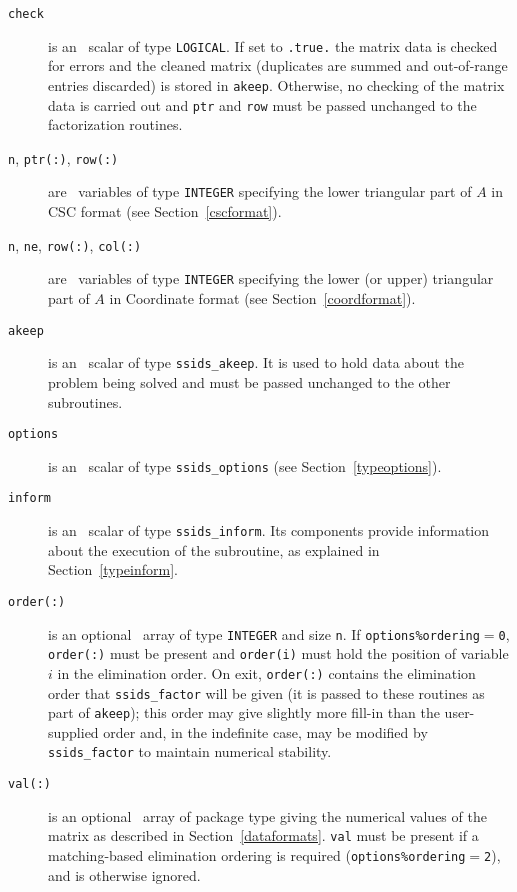 \documentclass{spral}
\begin{document}
\vspace*{-3mm}
\begin{description}

\item[\texttt{check}] is an \intentin\ scalar of
type  {\tt LOGICAL}. If set to {\tt .true.} the matrix
data is checked for errors and the cleaned matrix
(duplicates are summed and out-of-range entries
discarded) is stored in {\tt akeep}.
Otherwise, no checking of the matrix data is carried out
and {\tt ptr} and {\tt row} must be passed unchanged to the factorization routines.

\item[\texttt{n}{\rm ,} \texttt{ptr(:)}{\rm ,} \texttt{row(:)}] are \intentin\ 
   variables of type {\tt INTEGER} specifying the lower triangular part of $A$
   in CSC format (see Section~\ref{cscformat}).

\item[\texttt{n}{\rm ,} \texttt{ne}{\rm ,} \texttt{row(:)}{\rm ,} \texttt{col(:)}]
   are \intentin\ variables of type {\tt INTEGER} specifying the lower
   (or upper) triangular part of $A$ in Coordinate format (see Section~\ref{coordformat}).

\item[\texttt{akeep}] is an \intentout\ scalar of type
{\tt ssids\_akeep}. It is used to hold data about the problem being
solved and must be passed unchanged to the other subroutines.

\item[\texttt{options}] is an \intentin\ scalar of type {\tt ssids\_options}
(see Section~\ref{typeoptions}).

\item[\texttt{inform}] is an \intentout\ scalar of type
{\tt ssids\_inform}. Its components provide information about the execution
of the subroutine, as explained in Section~\ref{typeinform}.

\item[\texttt{order(:)}] is an optional \intentinout\ array of type
{\tt INTEGER} and size {\tt n}. If {\tt options\%ordering}$=${\tt 0},
{\tt order(:)} must be present and {\tt order(i)} must hold the  position of
variable $i$  in the elimination order. On exit, {\tt order(:)} contains the
elimination order that {\tt ssids\_factor} will be given (it is passed to these
routines as part of {\tt akeep}); this order may give slightly more fill-in
than the user-supplied order and, in the indefinite case, may be modified by
{\tt ssids\_factor} to maintain numerical stability. 

\item[\texttt{val(:)}] is an optional \intentin\ array of package type giving
the numerical values of the matrix as described in Section~\ref{dataformats}.
{\tt val} must be present if a matching-based elimination ordering is required
({\tt options\%ordering$=$2}), and is otherwise ignored.

\end{description}
\end{document}
